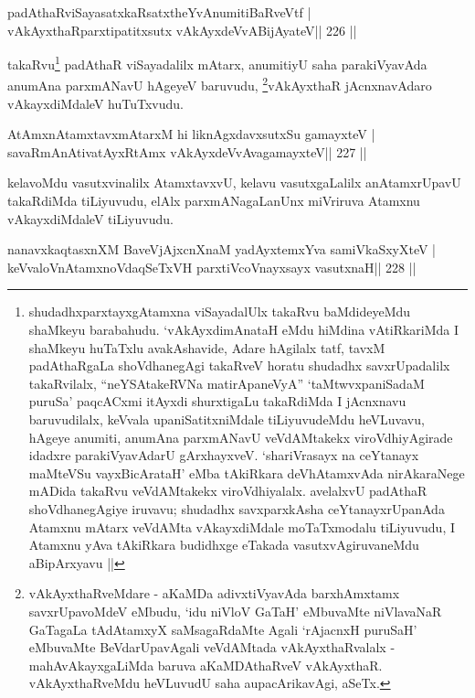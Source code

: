 \begin{shl}
padAthaRviSayasatxkaRsatxtheYvAnumitiBaRveVtf |
vAkAyxthaRparxtipatitxsutx vAkAyxdeVvABijAyateV\hfill || 226 ||
\end{shl}

\begin{artha}
takaRvu\footnote[2]{shudadhxparxtayxgAtamxna viSayadalUlx takaRvu baMdideyeMdu shaMkeyu barabahudu. `vAkAyxdimAnataH eMdu hiMdina vAtiRkariMda I shaMkeyu huTaTxlu avakAshavide, Adare hAgilalx tatf, tavxM padAthaRgaLa shoVdhanegAgi takaRveV horatu shudadhx savxrUpadalilx takaRvilalx, ``neYSAtakeRVNa matirApaneVyA'' `taMtwvxpaniSadaM puruSa' paqcACxmi itAyxdi shurxtigaLu takaRdiMda I jAcnxnavu baruvudilalx, keVvala upaniSatitxniMdale tiLiyuvudeMdu heVLuvavu, hAgeye anumiti, anumAna parxmANavU veVdAMtakekx viroVdhiyAgirade idadxre parakiVyavAdarU gArxhayxveV. `shariVrasayx na ceYtanayx maMteVSu vayxBicArataH' eMba tAkiRkara deVhAtamxvAda nirAkaraNege mADida takaRvu veVdAMtakekx viroVdhiyalalx. avelalxvU padAthaR shoVdhanegAgiye iruvavu; shudadhx savxparxkAsha ceYtanayxrUpanAda Atamxnu mAtarx veVdAMta vAkayxdiMdale moTaTxmodalu tiLiyuvudu, I Atamxnu yAva tAkiRkara budidhxge eTakada vasutxvAgiruvaneMdu aBipArxyavu ||} padAthaR viSayadalilx mAtarx, anumitiyU saha parakiVyavAda anumAna parxmANavU hAgeyeV baruvudu, \footnote[3]{vAkAyxthaRveMdare - aKaMDa adivxtiVyavAda barxhAmxtamx savxrUpavoMdeV eMbudu, `idu niVloV GaTaH' eMbuvaMte niVlavaNaR GaTagaLa tAdAtamxyX saMsagaRdaMte Agali `rAjacnxH puruSaH' eMbuvaMte BeVdarUpavAgali veVdAMtada vAkAyxthaRvalalx - mahAvAkayxgaLiMda baruva aKaMDAthaRveV vAkAyxthaR. vAkAyxthaRveMdu heVLuvudU saha aupacArikavAgi, aSeTx.}vAkAyxthaR jAcnxnavAdaro vAkayxdiMdaleV huTuTxvudu.
\end{artha}


\begin{shl}
AtAmxnAtamxtavxmAtarxM hi liknAgxdavxsutxSu gamayxteV |
savaRmAnAtivatAyxRtAmx vAkAyxdeVvAvagamayxteV\hfill || 227 ||
\end{shl}

\begin{artha}
kelavoMdu vasutxvinalilx AtamxtavxvU, kelavu vasutxgaLalilx anAtamxrUpavU takaRdiMda tiLiyuvudu, elAlx parxmANagaLanUnx miVriruva Atamxnu vAkayxdiMdaleV tiLiyuvudu.
\end{artha}


\begin{shl}
nanavxkaqtasxnXM BaveVjAjxcnXnaM yadAyxtemxYva samiVkaSxyXteV |
keVvaloV\s nAtamxnoV\s daqSeTxVH parxtiVcoV\s nayxsayx vasutxnaH\hfill || 228 ||
\end{shl}


